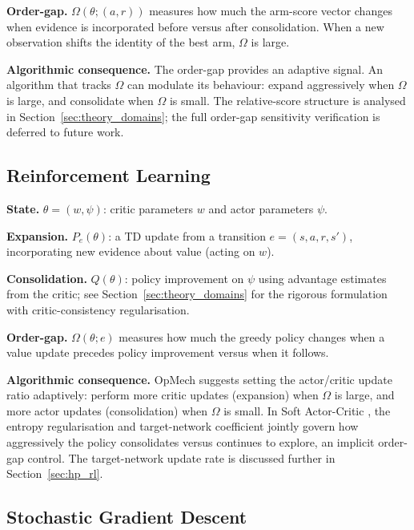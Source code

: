 \documentclass[12pt,a4paper]{article}
\newcommand{\Ogap}{\Omega}
\begin{document}
\textbf{Order-gap.}
$\Ogap(\theta; (a,r))$ measures how much the arm-score vector changes when
evidence is incorporated before versus after consolidation. When a new
observation shifts the identity of the best arm, $\Ogap$ is large.

\textbf{Algorithmic consequence.}
The order-gap provides an adaptive signal. An algorithm that tracks $\Ogap$
can modulate its behaviour: expand aggressively when $\Ogap$ is large, and
consolidate when $\Ogap$ is small. The relative-score structure is analysed in
Section~\ref{sec:theory_domains}; the full order-gap sensitivity verification is
deferred to future work.

\subsection{Reinforcement Learning}
\label{sec:rl}

\textbf{State.}
$\theta = (w, \psi)$: critic parameters $w$ and actor parameters $\psi$.

\textbf{Expansion.}
$P_e(\theta)$: a TD update from a transition $e = (s, a, r, s')$, incorporating
new evidence about value (acting on $w$).

\textbf{Consolidation.}
$Q(\theta)$: policy improvement on $\psi$ using advantage estimates from the
critic; see Section~\ref{sec:theory_domains} for the rigorous formulation
with critic-consistency regularisation.

\textbf{Order-gap.}
$\Ogap(\theta; e)$ measures how much the greedy policy changes when a value
update precedes policy improvement versus when it follows.

\textbf{Algorithmic consequence.}
OpMech suggests setting the actor/critic update ratio adaptively: perform more
critic updates (expansion) when $\Ogap$ is large, and more actor updates
(consolidation) when $\Ogap$ is small. In Soft Actor-Critic
\citep{haarnoja2018sac}, the entropy regularisation and target-network
coefficient jointly govern how aggressively the policy consolidates versus
continues to explore, an implicit order-gap control. The target-network
update rate is discussed further in Section~\ref{sec:hp_rl}.

\subsection{Stochastic Gradient Descent}
\label{sec:sgd}
\end{document}
